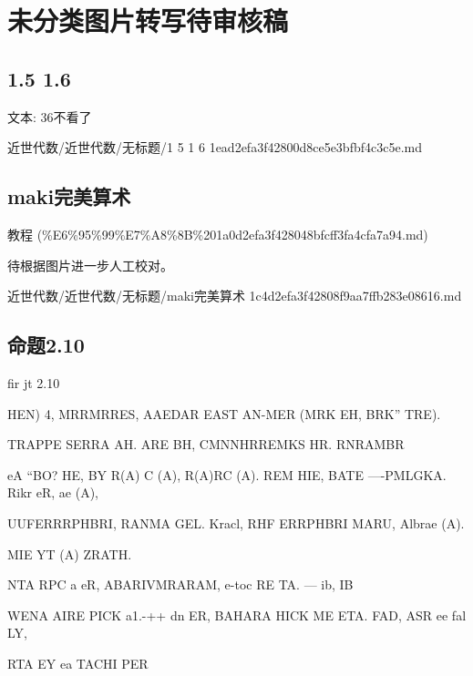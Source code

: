\chapter{未分类图片转写待审核稿}

\section*{1.5 1.6}

\begin{note}[1.5 1.6]

文本: 36不看了

\end{note}

\begin{note}[来源路径]

近世代数/近世代数/无标题/1 5 1 6 1ead2efa3f42800d8ce5e3bfbf4c3c5e.md

\end{note}

\section*{maki完美算术}

\begin{note}[来源上级主题]

教程 (\%E6\%95\%99\%E7\%A8\%8B\%201a0d2efa3f428048bfcff3fa4cfa7a94.md)

\end{note}

\begin{note}[maki完美算术]

待根据图片进一步人工校对。

\end{note}

\begin{note}[来源路径]

近世代数/近世代数/无标题/maki完美算术 1c4d2efa3f42808f9aa7ffb283e08616.md

\end{note}

\section*{命题2.10}

\begin{proposition}[命题2.10]

fir jt 2.10

HEN) 4, MRRMRRES, AAEDAR EAST AN-MER (MRK EH, BRK” TRE).

TRAPPE SERRA AH. ARE BH, CMNNHRREMKS HR. RNRAMBR

eA “BO? HE, BY R(A) C (A), R(A)RC (A). REM HIE, BATE —-PMLGKA. Rikr eR, ae (A),

UUFERRRPHBRI, RANMA GEL. Kracl, RHF ERRPHBRI MARU, Albrae (A).

MIE YT (A) ZRATH.

NTA RPC a eR, ABARIVMRARAM, e-toc RE TA. — ib, IB

WENA AIRE PICK a1.-++ dn ER, BAHARA HICK ME ETA. FAD, ASR ee fal LY,

RTA EY ea TACHI PER

\end{proposition}

